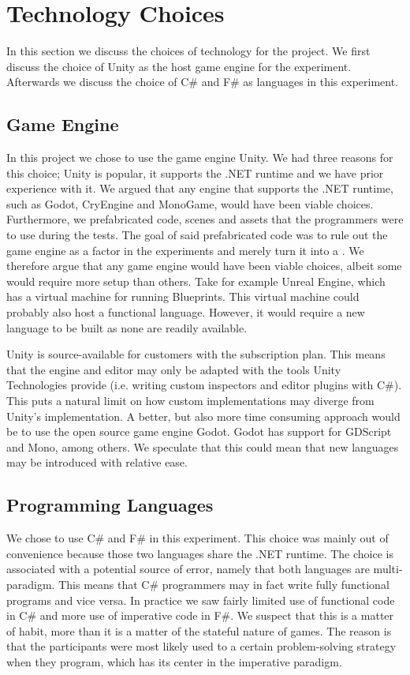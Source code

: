 \section{Technology Choices}
In this section we discuss the choices of technology for the project. We first discuss the choice of Unity as the host game engine for the experiment. Afterwards we discuss the choice of C\# and F\# as languages in this experiment.

\subsection{Game Engine}
In this project we chose to use the game engine Unity. We had three reasons for this choice; Unity is popular, it supports the .NET runtime and we have prior experience with it. We argued that any engine that supports the .NET runtime, such as Godot, CryEngine and MonoGame, would have been viable choices. Furthermore, we prefabricated code, scenes and assets that the programmers were to use during the tests. The goal of said prefabricated code was to rule out the game engine as a factor in the experiments and merely turn it into a .
We therefore argue that any game engine would have been viable choices, albeit some would require more setup than others. Take for example Unreal Engine, which has a virtual machine for running Blueprints\cite{unreal2019blueprintNativiziation}. This virtual machine could probably also host a functional language. However, it would require a new language to be built as none are readily available.

Unity is source-available for customers with the  subscription plan. This means that the engine and editor may only be adapted with the tools Unity Technologies provide (i.e. writing custom inspectors and editor plugins with C\#). This puts a natural limit on how  custom implementations may diverge from Unity's implementation. A better, but also more time consuming approach would be to use the open source game engine Godot. Godot has support for GDScript and Mono, among others. We speculate that this could mean that new languages may be introduced with relative ease.

\subsection{Programming Languages}
We chose to use C\# and F\# in this experiment. This choice was mainly out of convenience because those two languages share the .NET runtime. The choice is associated with a potential source of error, namely that both languages are multi-paradigm. This means that C\# programmers may in fact write fully functional programs and vice versa. In practice we saw fairly limited use of functional code in C\# and more use of imperative code in F\#. We suspect that this is a matter of habit, more than it is a matter of the stateful nature of games. The reason is that the participants were most likely used to a certain problem-solving strategy when they program, which has its center in the imperative paradigm. 

